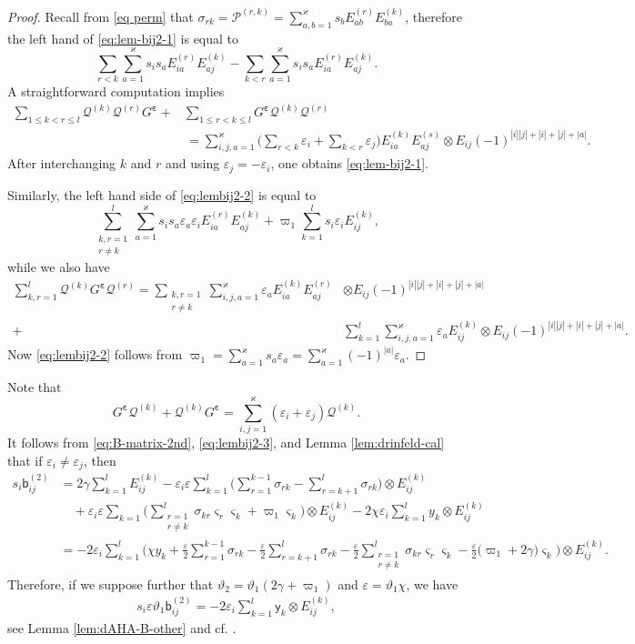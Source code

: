 \documentclass[11pt,reqno]{amsart}
\numberwithin{equation}{section}
\theoremstyle{definition}
\theoremstyle{remark}
\newcommand{\beq}{\begin{equation}}
\newcommand{\eeq}{\end{equation}}
\newcommand{\mc}{\mathcal}
\newcommand{\sfb}{\mathsf{b}}
\newcommand{\sfy}{\mathsf{y}}
\newcommand{\lle}{\leqslant}
\newcommand{\ka}{\varkappa}
\newcommand{\ve}{\varepsilon}
\begin{document}
\begin{proof}
Recall from \eqref{eq perm} that $\sigma_{rk}=\mc P^{(r,k)}=\sum_{a,b=1}^\ka s_bE_{ab}^{(r)}E_{ba}^{(k)}$, therefore the left hand of \eqref{eq:lem-bij2-1} is equal to
\[
\sum_{r<k}\sum_{a=1}^\ka s_is_aE_{ia}^{(r)}E_{aj}^{(k)}-\sum_{k<r}\sum_{a=1}^\ka s_is_aE_{ia}^{(r)}E_{aj}^{(k)}.
\]
A straightforward computation implies
\begin{align*}
\sum_{1\lle k<r\lle l}\mc Q^{(k)}\mc Q^{(r)}G^{\bm\ve}+&\sum_{1\lle r<k\lle l}G^{\bm\ve}\mc Q^{(k)}\mc Q^{(r)}\\ &\,=\sum_{i,j,a=1}^\ka \Big(\sum_{r<k}\ve_i+\sum_{k<r}\ve_j\Big)E_{ia}^{(k)}E_{aj}^{(s)}\otimes E_{ij}(-1)^{|i||j|+|i|+|j|+|a|}.
\end{align*}
After interchanging $k$ and $r$ and using $\ve_j=-\ve_i$, one obtains \eqref{eq:lem-bij2-1}.

Similarly, the left hand side of \eqref{eq:lembij2-2} is equal to
\[
\sum_{\substack{k,r=1\\ r\ne k}}^l \sum_{a=1}^\ka s_is_a\ve_a\ve_iE_{ia}^{(r)}E_{aj}^{(k)}+\varpi_1\sum_{k=1}^l s_i\ve_iE_{ij}^{(k)},
\]
while we also have
\begin{align*}
\sum_{k,r=1}^l\mc Q^{(k)}G^{\bm\ve}\mc Q^{(r)}=\sum_{\substack{k,r=1\\ r\ne k}}\sum_{i,j,a=1}^\ka \ve_aE_{ia}^{(k)}E_{aj}^{(r)}&\otimes E_{ij}(-1)^{|i||j|+|i|+|j|+|a|}\\+&\sum_{k=1}^l \sum_{i,j,a=1}^\ka \ve_a E_{ij}^{(k)}\otimes E_{ij}(-1)^{|i||j|+|i|+|j|+|a|}.
\end{align*}
Now \eqref{eq:lembij2-2} follows from  $\varpi_1=\sum_{a=1}^\ka s_a\ve_a=\sum_{a=1}^\ka (-1)^{|a|}\ve_a$.
\end{proof}
Note that
\beq\label{eq:lembij2-3}
G^{\bm\ve}\mc Q^{(k)}+\mc Q^{(k)}G^{\bm\ve}=\sum_{i,j=1}^\ka(\ve_i+\ve_j)\mc Q^{(k)}.
\eeq
It follows from \eqref{eq:B-matrix-2nd}, \eqref{eq:lembij2-3}, and Lemma \ref{lem:drinfeld-cal} that if $\ve_i\ne \ve_j$, then
\begin{align*}
s_i\sfb_{ij}^{(2)}&= 2\gamma \sum_{k=1}^l E_{ij}^{(k)}-\ve_i\ve\sum_{k=1}^l\Big(\sum_{r=1}^{k-1}\sigma_{rk}-\sum_{r=k+1}^{l}\sigma_{rk}\Big)\otimes E_{ij}^{(k)}\\
&\quad  +\ve_i\ve\sum_{k=1}\Big(\sum_{\substack{r=1\\ r\ne k}}^l\sigma_{kr}\varsigma_r\varsigma_k+\varpi_1\varsigma_k\Big)\otimes  E_{ij}^{(k)}-2\chi\ve_i\sum_{k=1}^l y_k\otimes  E_{ij}^{(k)}\\
&= -2\ve_i\sum_{k=1}^l\Big(\chi y_k+\frac{\ve}{2}\sum_{r=1}^{k-1}\sigma_{rk}-\frac{\ve}{2}\sum_{r=k+1}^{l}\sigma_{rk}-\frac{\ve}{2}\sum_{\substack{r=1\\ r\ne k}}^l\sigma_{kr}\varsigma_r\varsigma_k-\frac{\ve}{2}\big(\varpi_1+2\gamma\big)\varsigma_k\Big)\otimes  E_{ij}^{(k)}.
\end{align*}
Therefore, if we suppose further that $\vartheta_2=\vartheta_1(2\gamma+\varpi_1)$ and $\ve=\vartheta_1\chi$, we have
\begin{align*}
s_i\ve\vartheta_1\sfb_{ij}^{(2)}
=-2\ve_i \sum_{k=1}^l \sfy_k\otimes E_{ij}^{(k)},
\end{align*}
see Lemma \ref{lem:dAHA-B-other} and cf. \cite[Equation (4.1)]{Chen2014twisted}.
\end{document}
